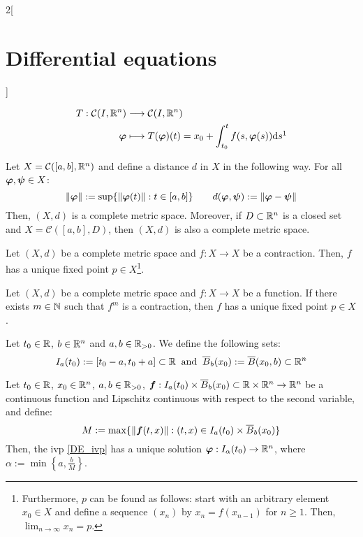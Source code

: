 \documentclass[../../../main.tex]{subfiles}
\begin{document}
\begin{multicols}{2}[\section{Differential equations}]
\begin{definition}
\begin{align*}
      T:\mathcal{C}(I,\RR^n)   & \longrightarrow\mathcal{C}(I,\RR^n)                                                                           \\
      \vectorfunction{\varphi} & \longmapsto T(\vectorfunction{\varphi})(t)=x_0+\int_{t_0}^tf(s,\vectorfunction{\varphi}(s))\dd s\footnotemark
    \end{align*}
  \end{definition}
  \begin{prop}
    Let $X=\mathcal{C}([a,b],\mathbb{R}^n)$ and define a distance $d$ in $X$ in the following way. For all $\boldsymbol{\varphi},\boldsymbol{\psi}\in X$: $$\|\boldsymbol{\varphi}\|:=\sup\{\|\boldsymbol{\varphi}(t)\|:t\in[a,b]\}\qquad d(\boldsymbol{\varphi},\boldsymbol{\psi}):=\|\boldsymbol{\varphi}-\boldsymbol{\psi}\|$$ Then, $(X,d)$ is a complete metric space. Moreover, if $D\subset\mathbb{R}^n$ is a closed set and $X=\mathcal{C}([a,b],D)$, then $(X,d)$ is also a complete metric space.
  \end{prop}
  \begin{theorem}
    Let $(X,d)$ be a complete metric space and $f:X\rightarrow X$ be a contraction. Then, $f$ has a unique fixed point $p\in X$\footnote{Furthermore, $p$ can be found as follows: start with an arbitrary element$x_0\in X$ and define a sequence $(x_n)$ by $x_n=f(x_{n-1})$ for $n\geq 1$. Then, $\lim_{n\to\infty} x_n=p$.}.
  \end{theorem}
  \begin{corollary}
    Let $(X,d)$ be a complete metric space and $f:X\rightarrow X$ be a function. If there exists $m\in\mathbb{N}$ such that $f^m$ is a contraction, then $f$ has a unique fixed point $p\in X$.
  \end{corollary}
  \begin{definition}
    Let $t_0\in\mathbb{R}$, $b\in\mathbb{R}^n$ and $a,b\in\mathbb{R}_{>0}$. We define the following sets: $$I_a(t_0):=[t_0-a,t_0+a]\subset\mathbb{R}\;\;\text{and}\;\;\overline{B}_{b}(x_0):=\overline{B}(x_0,b)\subset\mathbb{R}^n$$
  \end{definition}
  \begin{theorem}\label{DE_picard}
    Let $t_0\in\mathbb{R}$, $x_0\in\mathbb{R}^n$, $a,b\in\mathbb{R}_{>0}$, $\boldsymbol{f}:I_a(t_0)\times\overline{B}_{b}(x_0)\subset\mathbb{R}\times\mathbb{R}^n\rightarrow\mathbb{R}^n$ be a continuous function and Lipschitz continuous with respect to the second variable, and define: $$M:=\max\{\|\boldsymbol{f}(t,x)\|:(t,x)\in I_a(t_0)\times\overline{B}_{b}(x_0)\}$$ Then, the ivp \eqref{DE_ivp} has a unique solution $\boldsymbol{\varphi}:I_\alpha(t_0)\rightarrow\mathbb{R}^n$, where $\alpha:=\min\left\{a,\frac{b}{M}\right\}$.

\end{theorem}
\end{multicols}
\end{document}
